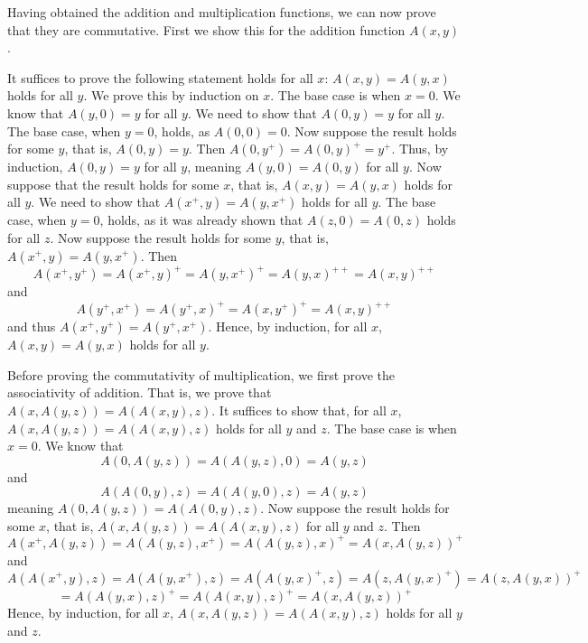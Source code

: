 \documentclass{article}
\theoremstyle{definition}
\begin{document}
Having obtained the addition and multiplication functions, we can now prove that they are commutative. First we show this for the addition function $A(x,y)$.

It suffices to prove the following statement holds for all $x$: $A(x,y)=A(y,x)$ holds for all $y$. We prove this by induction on $x$. The base case is when $x=0$. 
We know that $A(y,0)=y$ for all $y$. We need to show that $A(0,y)=y$ for all $y$. The base case, when $y=0$, holds, as $A(0,0)=0$. Now suppose the result holds for some $y$, that is, 
$A(0,y)=y$. Then $A(0,y^+)=A(0,y)^+=y^+$. Thus, by induction, $A(0,y)=y$ for all $y$, meaning $A(y,0)=A(0,y)$ for all $y$. Now suppose that the result holds for some $x$, that is, 
$A(x,y)=A(y,x)$ holds for all $y$. We need to show that $A(x^+,y)=A(y,x^+)$ holds for all $y$. The base case, when $y=0$, holds, as it was already shown that 
$A(z,0)=A(0,z)$ holds for all $z$. Now suppose the result holds for some $y$, that is, $A(x^+,y)=A(y,x^+)$. Then
\[ A(x^+,y^+)=A(x^+,y)^+=A(y,x^+)^+=A(y,x)^{++}=A(x,y)^{++} \]
and
\[ A(y^+,x^+)=A(y^+,x)^+=A(x,y^+)^+=A(x,y)^{++} \] and thus
$A(x^+,y^+)=A(y^+,x^+)$. Hence, by induction, for all $x$, $A(x,y)=A(y,x)$ holds for all $y$.

Before proving the commutativity of multiplication, we first prove the associativity of addition. That is, we prove that $A(x,A(y,z))=A(A(x,y),z)$. It suffices to show that, for all $x$, 
$A(x,A(y,z))=A(A(x,y),z)$ holds for all $y$ and $z$. The base case is when $x=0$. We know that
\[ A(0,A(y,z))=A(A(y,z),0)=A(y,z) \] and
\[ A(A(0,y),z)=A(A(y,0),z)=A(y,z) \] meaning $A(0,A(y,z))=A(A(0,y),z)$. Now suppose the result holds for some $x$, that is, $A(x,A(y,z))=A(A(x,y),z)$ for all $y$ and $z$. Then
\[ A(x^+,A(y,z))=A(A(y,z),x^+)=A(A(y,z),x)^+=A(x,A(y,z))^+ \] and
\[ A(A(x^+,y),z)=A(A(y,x^+),z)=A(A(y,x)^+,z)=A(z,A(y,x)^+)=A(z,A(y,x))^+ \]
\[ =A(A(y,x),z)^+=A(A(x,y),z)^+=A(x,A(y,z))^+ \]
Hence, by induction, for all $x$, $A(x,A(y,z))=A(A(x,y),z)$ holds for all $y$ and $z$.
\end{document}
